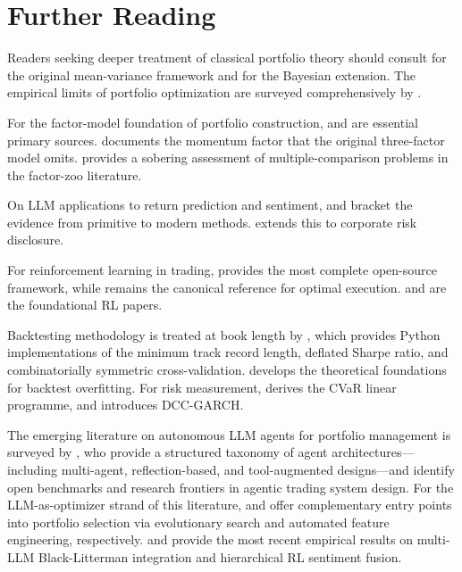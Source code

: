 \section{Further Reading}
\label{sec:ch10-further-reading}

Readers seeking deeper treatment of classical portfolio theory should consult
\citet{markowitz1952portfolio} for the original mean-variance framework and
\citet{blacklitterman1992} for the Bayesian extension. The empirical limits of portfolio
optimization are surveyed comprehensively by \citet{demiguel2009optimal}.

For the factor-model foundation of portfolio construction, \citet{fama1993common} and
\citet{fama2015five} are essential primary sources. \citet{carhart1997persistence}
documents the momentum factor that the original three-factor model omits.
\citet{harvey2016cross} provides a sobering assessment of multiple-comparison problems
in the factor-zoo literature.

On LLM applications to return prediction and sentiment, \citet{LopezLiraTang2023}
and \citet{tetlock2007giving} bracket the evidence from primitive to modern methods.
\citet{kim2023llm} extends this to corporate risk disclosure.

For reinforcement learning in trading, \citet{liu2022finrl} provides the most complete
open-source framework, while \citet{almgren2001optimal} remains the canonical reference
for optimal execution. \citet{mnih2015human} and \citet{schulman2017proximal} are the
foundational RL papers.

Backtesting methodology is treated at book length by \citet{lopezdeprado2018advances}, which
provides Python implementations of the minimum track record length, deflated Sharpe
ratio, and combinatorially symmetric cross-validation. \citet{bailey2014probability}
develops the theoretical foundations for backtest overfitting. For risk measurement,
\citet{rockafellar2000optimization} derives the CVaR linear programme, and
\citet{engle2002dynamic} introduces DCC-GARCH.

The emerging literature on autonomous LLM agents for portfolio management is surveyed
by \citet{SahaLyuEtAl2025}, who provide a structured taxonomy of agent architectures---
including multi-agent, reflection-based, and tool-augmented designs---and identify open
benchmarks and research frontiers in agentic trading system design. For the LLM-as-optimizer
strand of this literature, \citet{Yuksel2025alpha} and \citet{YukselAlphaQuant2025}
offer complementary entry points into portfolio selection via evolutionary search and
automated feature engineering, respectively. \citet{MantshimuliMwamba2025} and
\citet{CoriatBenhamou2025} provide the most recent empirical results on multi-LLM
Black-Litterman integration and hierarchical RL sentiment fusion.

